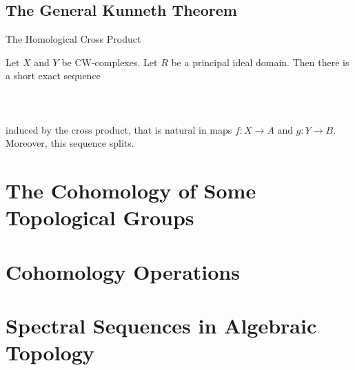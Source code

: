 \documentclass[a4paper]{article}
\begin{document}
\subsection{The General Kunneth Theorem}
\begin{defn}{The Homological Cross Product}{}
\end{defn}

\begin{thm}{}{} Let $X$ and $Y$ be CW-complexes. Let $R$ be a principal ideal domain. Then there is a short exact sequence \\~\\
\\~\\
induced by the cross product, that is natural in maps $f:X\to A$ and $g:Y\to B$. Moreover, this sequence splits. 
\end{thm}

\pagebreak
\section{The Cohomology of Some Topological Groups}

\pagebreak
\section{Cohomology Operations}

\pagebreak
\section{Spectral Sequences in Algebraic Topology}
\end{document}
